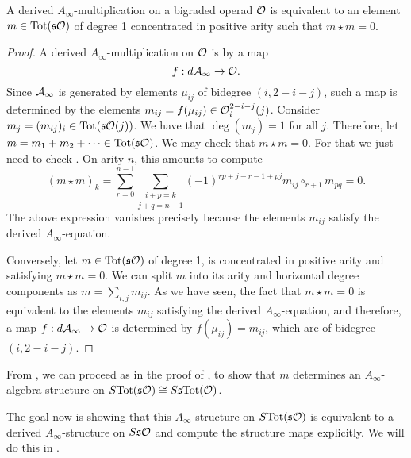 \documentclass[join.tex]{subfiles}
\begin{document}
\begin{lem}\label{mstar}
A derived $A_\infty$-multiplication on a bigraded operad ${\mathcal O}$ is equivalent to an element $m\in\mathrm{Tot}(\mathfrak{s}{\mathcal O})$ of degree 1 concentrated in positive arity such that $m\star m = 0$. 
\end{lem}
\begin{proof}
A derived $A_\infty$-multiplication on ${\mathcal O}$ is by  a map 
\[f:d\mathcal{A}_\infty\to{\mathcal O}.\]
Since $\mathcal{A}_\infty$ is generated by elements $\mu_{ij}$ of bidegree $(i,2-i-j)$, such a map is determined by the elements $m_{ij}=f(\mu_{ij})\in{\mathcal O}^{2-i-j}_i(j)$. Consider $m_j = (m_{ij})_i\in\mathrm{Tot}(\mathfrak{s}{\mathcal O}(j))$. We have that $\deg(m_j)=1$ for all $j$. Therefore, let $m=m_1+m_2+\cdots\in\mathrm{Tot}(\mathfrak{s}{\mathcal O})$. We may check that $m\star m=0$. For that we just need to check . On arity $n$, this amounts to compute 
\[(m\star m)_k = \sum_{r=0}^{n-1}\underset{j+q=n-1}{\sum_{i+p=k}}(-1)^{rp+j-r-1+ pj}m_{ij}\circ_{r+1}m_{pq}=0.\]
The above expression vanishes precisely because the elements $m_{ij}$ satisfy the derived $A_\infty$-equation.

Conversely, let $m\in\mathrm{Tot}(\mathfrak{s}{\mathcal O})$ of degree 1, is concentrated in positive arity and satisfying $m\star m=0$. We can split $m$ into its arity and horizontal degree components as $m=\sum_{i,j}m_{ij}$. As we have seen, the fact that $m\star m=0$ is equivalent to the elements $m_{ij}$ satisfying the derived $A_\infty$-equation, and therefore, a map $f:d\mathcal{A}_\infty\to{\mathcal O}$ is determined by $f(\mu_{ij})=m_{ij}$, which are of bidegree $(i,2-i-j)$. 
\end{proof}


From , we can proceed as in the proof of , to show that $m$ determines an $A_\infty$-algebra structure on $S\mathrm{Tot}(\mathfrak{s}{\mathcal O})\cong S\mathfrak{s} \mathrm{Tot}({\mathcal O})$. %

The goal now is showing that this $A_\infty$-structure on $S\mathrm{Tot}(\mathfrak{s}{\mathcal O})$ is equivalent to a derived $A_\infty$-structure on $S\mathfrak{s} {\mathcal O}$ and compute the structure maps explicitly. We will do this in . 
\end{document}

